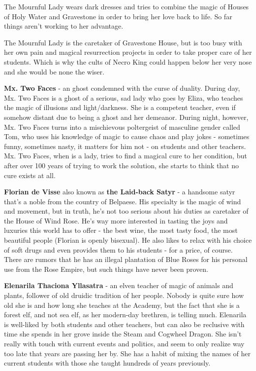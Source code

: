 \documentclass[a4paper,11pt]{article}
\begin{document}
The Mournful Lady wears dark dresses and tries to combine the magic of Houses of Holy Water and Gravestone in order to bring her love back to life. So far things aren't working to her advantage. 
 
The Mournful Lady is the caretaker of Gravestone House, but is too busy with her own pain and magical resurrection projects in order to take proper care of her students. Which is why the cults of Necro King could happen below her very nose and she would be none the wiser. 

\textbf{Mx. Two Faces} - an ghost condemned with the curse of duality. During day, Mx. Two Faces is a ghost of a serious, sad lady who goes by Eliza, who teaches the magic of illusions and light/darkness. She is a competent teacher, even if somehow distant due to being a ghost and her demeanor. During night, however, Mx. Two Faces turns into a mischievous poltergeist of masculine gender called Tom, who uses his knowledge of magic to cause chaos and play jokes - sometimes funny, sometimes nasty, it matters for him not - on students and other teachers. Mx. Two Faces, when is a lady, tries to find a magical cure to her condition, but after over 100 years of trying to work the solution, she starts to think that no cure exists at all. 

\textbf{Florian de Visse} also known as \textbf{the Laid-back Satyr} - a handsome satyr that's a noble from the country of Belpaese. His specialty is the magic of wind and movement, but in truth, he's not too serious about his duties as caretaker of the House of Wind Rose. He's way more interested in tasting the joys and luxuries this world has to offer - the best wine, the most tasty food, the most beautiful people (Florian is openly bisexual). He also likes to relax with his choice of soft drugs and even provides them to his students - for a price, of course. There are rumors that he has an illegal plantation of Blue Roses for his personal use from the Rose Empire, but such things have never been proven. 

\textbf{Elenarila Thaciona Yllasatra} - an elven teacher of magic of animals and plants, follower of old druidic tradition of her people. Nobody is quite sure how old she is and how long she teaches at the Academy, but the fact that she is a forest elf, and not sea elf, as her modern-day brethren, is telling much. Elenarila is well-liked by both students and other teachers, but can also be reclusive with time she spends in her grove inside the Steam and Cogwheel Dragon. She isn't really with touch with current events and politics, and seem to only realize way too late that years are passing her by. She has a habit of mixing the names of her current students with those she taught hundreds of years previously. 
\end{document}
